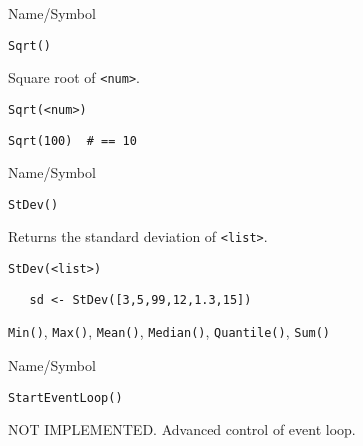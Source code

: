 \rl



\begin{desc}{Name/Symbol}
\item[Name/Symbol]  	\verb+Sqrt()+ 

\item[Description]  	Square root of \verb+<num>+.

\item[Usage]        	
\begin{verbatim}
Sqrt(<num>)
\end{verbatim}

\item[Example]
\begin{verbatim}
Sqrt(100)  # == 10
\end{verbatim}

\item[See Also]	
\end{desc}

\rl


\begin{desc}{Name/Symbol}
\item[Name/Symbol]  	\verb+StDev()+ 

\item[Description]  Returns the standard deviation of \verb+<list>+.

\item[Usage]       	
\begin{verbatim}
StDev(<list>)        
\end{verbatim}

\item[Example]	
\begin{verbatim}
   sd <- StDev([3,5,99,12,1.3,15])        
\end{verbatim}

\item[See Also]     	\verb+Min()+, \verb+Max()+, \verb+Mean()+, \verb+Median()+, \verb+Quantile()+, \verb+Sum()+
\end{desc}

\rl


\begin{desc}{Name/Symbol}
\item[Name/Symbol]  	\verb+StartEventLoop()+

\item[Description]  	NOT IMPLEMENTED. Advanced control of event loop.

\item[Usage]		

\item[Example]	

\item[See Also]	
\end{desc}

